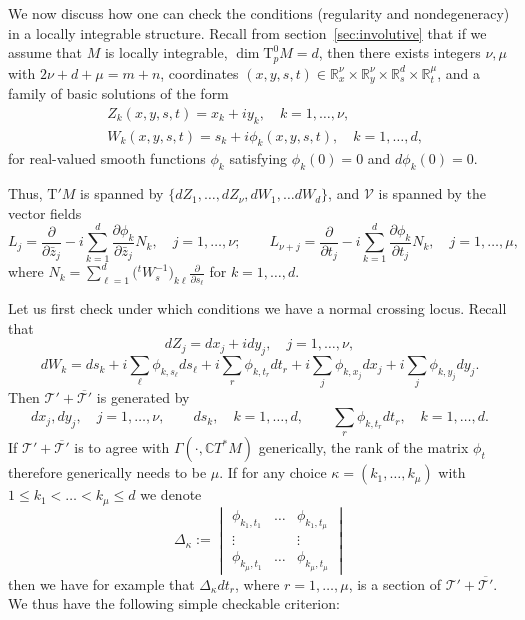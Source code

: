 \documentclass[11pt]{amsart}
\newcommand{\crb}{\mathcal{V}}
\newcommand{\C}{\mathbb{C}}
\newcommand{\R}{\mathbb{R}}
\newcommand{\holforms}{\mathrm{T}'}
\newcommand{\charforms}{\mathrm{T}^0}
\newcommand{\holsheaf}{\mathcal{T}'}
\theoremstyle{definition}
\theoremstyle{remark}
\theoremstyle{plain}
\begin{document}
  We now discuss how one can check the conditions (regularity and nondegeneracy) in a locally
  integrable structure. Recall from section~\ref{sec:involutive} that if we assume that $M$ is locally
  integrable, $\dim \charforms_p M = d$, then there exists integers  $\nu, \mu$ with $2 \nu + d +\mu = m+n$,
  coordinates 
  $ (x,y,s,t) \in \R^\nu_x \times \R^\nu_y \times \R_s^d \times \R_t^\mu$, and a family of basic solutions of the
  form
  \begin{align*}
  &Z_k(x,y,s,t) = x_k + iy_k, \quad k = 1, \dots, \nu,\\
  &W_k(x,y,s,t) = s_k + i\phi_k (x,y,s,t), \quad k =1, \dots, d,
\end{align*}
for real-valued smooth functions $\phi_k$ satisfying $\phi_k(0) = 0$ and $d\phi_k (0)= 0$.

Thus, $\holforms M$ is spanned by $\{ dZ_1, \dots, dZ_\nu,  dW_1, \dots dW_d \}$, and
$\crb$ is spanned by the vector fields
%
\[
  L_j = \frac{\partial}{\partial \bar{z}_j} - i \sum_{k=1}^d \frac{\partial \phi_k}{\partial \bar{z}_j} N_k, \quad  j = 1, \dots, \nu; \qquad 
  L_{\nu+ j} = \frac{\partial}{\partial t_j} - i\sum_{k=1}^d \frac{\partial \phi_k}{\partial t_j} N_k, \quad j=1, \dots, \mu,
\]
%
where $
N_k = \sum_{\ell = 1}^d \big({}^tW_s^{-1}\big)_{k\ell} \frac{\partial}{\partial s_\ell}$ for
$k=1,\dots,d$.

Let us first check under which conditions we have a normal crossing locus. Recall that
\[ dZ_j = d x_j + i dy_j,\quad j = 1,\dots, \nu,\]
\[  dW_k = ds_k + i\sum_\ell \phi_{k,s_\ell } ds_\ell  + i \sum_r \phi_{k,t_r } dt_r + i\sum_j \phi_{k,x_j } dx_j  + i \sum_j \phi_{k,y_j } dy_j. \]
Then $\holsheaf+ \overline{\holsheaf}$ is generated by
\[ d x_j, dy_j, \quad j= 1, \dots, \nu, \qquad ds_k, \quad k =1,\dots, d, \qquad \sum_r \phi_{k,t_r} dt_r , \quad k=1,\dots, d. \]
If $\holsheaf+\overline{\holsheaf}$ is to agree with $\Gamma(\cdot, \C T^*M)$ generically, the
rank of the matrix $\phi_t$ therefore generically needs to be $\mu$. If for any choice $\kappa = (k_1, \dots, k_\mu)$ with  $1\leq k_1 < \dots < k_\mu \leq d $ we  denote
\[ \Delta_\kappa :=
  \begin{vmatrix}
    \phi_{k_1, t_1} &\dots & \phi_{k_1, t_\mu} \\
    \vdots & & \vdots \\
    \phi_{k_\mu, t_1} &\dots & \phi_{k_\mu, t_\mu}
  \end{vmatrix} \]
then we have for example that $\Delta_\kappa dt_r $, where $ r=1,\dots, \mu$, is a section of $\holsheaf+ \overline{\holsheaf}$.
We thus have the following simple checkable criterion:
\end{document}
